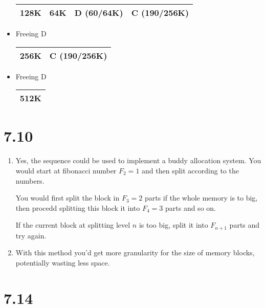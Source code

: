 \documentclass[12pt]{article}
\begin{document}
\begin{itemize}
		\begin{tabular}{|p{}|p{}|p{}|p{}|}
			\hline
			128K & 64K & D (60/64K) & C (190/256K)\\
			\hline
		\end{tabular}
		\item Freeing D

		\begin{tabular}{|p{}|p{}|}
			\hline
			256K & C (190/256K)\\
			\hline
		\end{tabular}
		\item Freeing D

		\begin{tabular}{|p{\linewidth}|}
			\hline
			512K\\
			\hline
		\end{tabular}
	\end{itemize}

\section*{7.10}
\begin{enumerate}[a]
	\item %
	Yes, the sequence could be used to implement a buddy allocation system. You would start at fibonacci number $F_2 = 1$ and then split according to the numbers.

	You would first split the block in $F_3 = 2$ parts if the whole memory is to big, then procedd splitting this block it into $F_4 = 3$ parts and so on.

	If the current block at splitting level $n$ is too big, split it into $F_{n + 1}$ parts and try again.

	\item %
	With this method you'd get more granularity for the size of memory blocks, potentially wasting less space.
\end{enumerate}

\section*{7.14}
\end{document}
